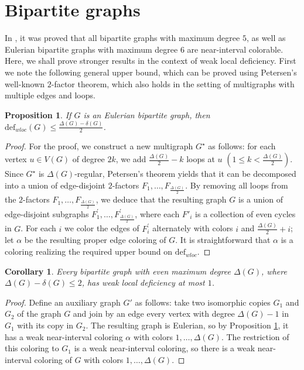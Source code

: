 \documentclass[12pt]{article}
\theoremstyle{plain}
\newtheorem{corollary}[theorem]{Corollary}
\newtheorem{proposition}[theorem]{Proposition}
\theoremstyle{definition}
\numberwithin{equation}{section}
\begin{document}


\section{Bipartite graphs}

	In \cite{CasselgrenPetrosyan}, it was proved
	that all bipartite graphs with maximum degree $5$, as well as Eulerian bipartite graphs
	with maximum degree $6$ are near-interval colorable. Here, we shall 
	prove stronger results in the context of weak local deficiency.
	First we note the following general upper bound, which can be proved using
	Petersen's well-known $2$-factor theorem, 
	which also holds in the setting of multigraphs
	with multiple edges and loops.

\begin{proposition}
\label{th:Eul}
If $G$ is an Eulerian bipartite graph, then $\mathrm{def}_{wloc}(G)\leq \frac{\Delta(G)-\delta(G)}{2}$.	
\end{proposition}
\begin{proof}
For the proof, we construct a new multigraph $G^{\star}$ as follows: 
for each vertex $u \in V(G)$ of degree $2k$, we add $\frac{\Delta(G)}{2}-k$ loops at $u$ 
$\left(1\leq k< \frac{\Delta(G)}{2}\right)$. Since $G^{\star}$ is $\Delta(G)$-regular, 
Petersen's theorem yields that it can be decomposed into
a union of edge-disjoint $2$-factors $F_{1},\ldots,F_{\frac{\Delta(G)}{2}}$. By removing all
loops from the $2$-factors $F_{1},\ldots,F_{\frac{\Delta(G)}{2}}$, we
deduce that the resulting graph $G$ is a union of edge-disjoint
subgraphs $F^{\prime}_{1},\ldots,F^{\prime}_{\frac{\Delta(G)}{2}}$, where each
$F'_{i}$ is a collection of even cycles in $G$.
For each $i$ %
we color the edges of $F^{\prime}_{i}$ alternately with colors
$i$ and $\frac{\Delta(G)}{2}+i$; let $\alpha$ be the resulting proper edge coloring of $G$. 
It is straightforward that $\alpha$ is a coloring realizing the required upper bound on
$\mathrm{def}_{wloc}$.
\end{proof}

\begin{corollary}
\label{prop:bip1}
Every bipartite graph with even maximum degree $\Delta(G)$, where $\Delta(G) - \delta(G)\leq 2$,
has weak local deficiency at most $1$.
\end{corollary}
\begin{proof}
Define an auxiliary graph $G'$ as follows:
take two isomorphic copies $G_{1}$ and $G_{2}$ of the graph 
$G$ and join by an edge every vertex with degree $\Delta(G)-1$ in $G_{1}$ with its copy in $G_{2}$.
The resulting graph is Eulerian, so by Proposition \ref{th:Eul},
it has a weak near-interval coloring $\alpha$ with colors $1,\ldots,\Delta(G)$. 
The restriction of this coloring to $G_1$ is a weak near-interval coloring, so
there is a weak near-interval coloring of $G$ with colors $1,\ldots,\Delta(G)$. 
\end{proof}
\end{document}
